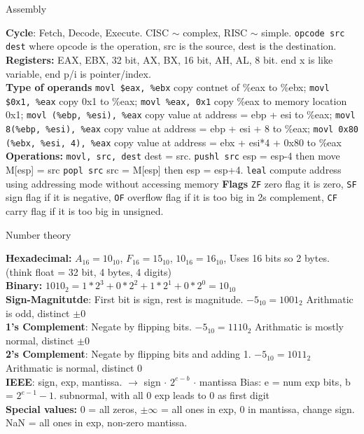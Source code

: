 \documentclass[answers,12pt,addpoints]{exam}
\begin{document}
\begin{center}
    Assembly
\end{center}
\textbf{Cycle}: Fetch, Decode, Execute. CISC $\sim$ complex, RISC $\sim$ simple. \texttt{opcode src dest} where opcode is the operation, src is the source, dest is the destination. \\
\textbf{Registers:} EAX, EBX, 32 bit, AX, BX, 16 bit, AH, AL, 8 bit. end x is like variable, end p/i is pointer/index. \\
\textbf{Type of operands} \texttt{movl \$eax, \%ebx}  copy contnet of \%eax to \%ebx; \texttt{movl \$0x1, \%eax} copy 0x1 to \%eax; \texttt{movl \%eax, 0x1} copy \%eax to memory location 0x1; \texttt{movl (\%ebp, \%esi), \%eax} copy value at address = ebp + esi to \%eax; \texttt{movl 8(\%ebp, \%esi), \%eax} copy value at address = ebp + esi + 8 to \%eax; \texttt{movl 0x80 (\%ebx, \%esi, 4), \%eax} copy value at address = ebx + esi*4 + 0x80 to \%eax \\
\textbf{Operations:} \texttt{movl, src, dest} dest = src.  \texttt{pushl src} esp = esp-4 then move M[esp] = src  \texttt{popl src} src = M[esp] then esp = esp+4. \texttt{leal} compute address using addressing mode without accessing memory
\textbf{Flags} \texttt{ZF} zero flag it is zero, \texttt{SF} sign flag if it is negative, \texttt{OF} overflow flag if it is too big in 2s complement, \texttt{CF} carry flag if it is too big in unsigned. 
\begin{center}
    Number theory
\end{center}
\textbf{Hexadecimal:} $A_{16} = 10_{10}$, $F_{16} = 15_{10}$, $10_{16} = 16_{10}$, Uses 16 bits so 2 bytes. (think float = 32 bit, 4 bytes, 4 digits) \\
\textbf{Binary:} $1010_2 = 1*2^3 + 0*2^2 + 1*2^1 + 0*2^0 = 10_{10}$ \\
\textbf{Sign-Magnitutde}: First bit is sign, rest is magnitude. $-5_{10} = 1001_2$ Arithmatic is odd, distinct $\pm0$ \\
\textbf{1's Complement}: Negate by flipping bits. $-5_{10} = 1110_2$ Arithmatic is mostly normal, distinct $\pm0$ \\
\textbf{2's Complement}: Negate by flipping bits and adding 1. $-5_{10} = 1011_2$ Arithmatic is normal, distinct $0$ \\
\textbf{IEEE}: sign, exp, mantissa. $\to$ sign $\cdot$ $2^{e-b}$ $\cdot$ mantissa Bias: e = num exp bits, b = $2^{e-1}-1$. subnormal, with all 0 exp leads to 0 as first digit \\
\textbf{Special values:} 0 = all zeros, $\pm \infty$ = all ones in exp, 0 in mantissa, change sign. NaN = all ones in exp, non-zero mantissa. \\
\end{document}
